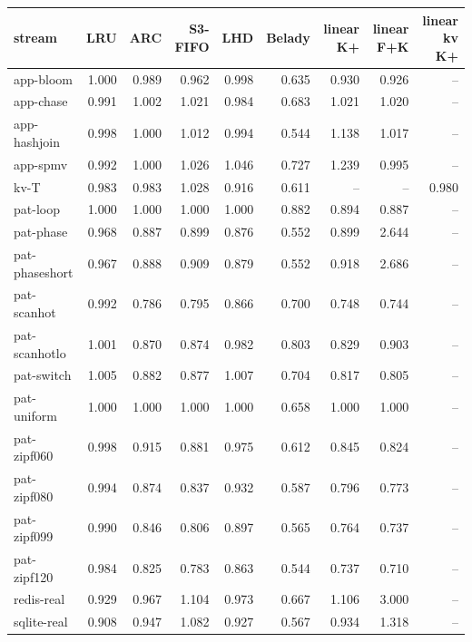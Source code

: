 \begin{tabular}{lrrrrrrrr}
\toprule
stream & LRU & ARC & S3-FIFO & LHD & Belady & linear K+ & linear F+K & linear kv K+ \\
\midrule
app-bloom & 1.000 & 0.989 & 0.962 & 0.998 & 0.635 & 0.930 & 0.926 & -- \\
app-chase & 0.991 & 1.002 & 1.021 & 0.984 & 0.683 & 1.021 & 1.020 & -- \\
app-hashjoin & 0.998 & 1.000 & 1.012 & 0.994 & 0.544 & 1.138 & 1.017 & -- \\
app-spmv & 0.992 & 1.000 & 1.026 & 1.046 & 0.727 & 1.239 & 0.995 & -- \\
kv-T & 0.983 & 0.983 & 1.028 & 0.916 & 0.611 & -- & -- & 0.980 \\
pat-loop & 1.000 & 1.000 & 1.000 & 1.000 & 0.882 & 0.894 & 0.887 & -- \\
pat-phase & 0.968 & 0.887 & 0.899 & 0.876 & 0.552 & 0.899 & 2.644 & -- \\
pat-phaseshort & 0.967 & 0.888 & 0.909 & 0.879 & 0.552 & 0.918 & 2.686 & -- \\
pat-scanhot & 0.992 & 0.786 & 0.795 & 0.866 & 0.700 & 0.748 & 0.744 & -- \\
pat-scanhotlo & 1.001 & 0.870 & 0.874 & 0.982 & 0.803 & 0.829 & 0.903 & -- \\
pat-switch & 1.005 & 0.882 & 0.877 & 1.007 & 0.704 & 0.817 & 0.805 & -- \\
pat-uniform & 1.000 & 1.000 & 1.000 & 1.000 & 0.658 & 1.000 & 1.000 & -- \\
pat-zipf060 & 0.998 & 0.915 & 0.881 & 0.975 & 0.612 & 0.845 & 0.824 & -- \\
pat-zipf080 & 0.994 & 0.874 & 0.837 & 0.932 & 0.587 & 0.796 & 0.773 & -- \\
pat-zipf099 & 0.990 & 0.846 & 0.806 & 0.897 & 0.565 & 0.764 & 0.737 & -- \\
pat-zipf120 & 0.984 & 0.825 & 0.783 & 0.863 & 0.544 & 0.737 & 0.710 & -- \\
redis-real & 0.929 & 0.967 & 1.104 & 0.973 & 0.667 & 1.106 & 3.000 & -- \\
sqlite-real & 0.908 & 0.947 & 1.082 & 0.927 & 0.567 & 0.934 & 1.318 & -- \\
\bottomrule
\end{tabular}
